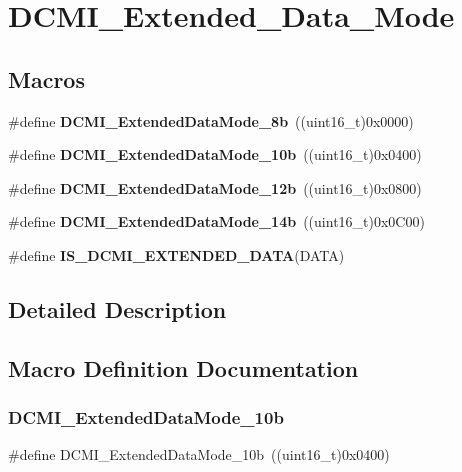 \section{D\+C\+M\+I\+\_\+\+Extended\+\_\+\+Data\+\_\+\+Mode}
\label{group__DCMI__Extended__Data__Mode}
\subsection*{Macros}
\begin{DoxyCompactItemize}
\item 
\#define \textbf{ D\+C\+M\+I\+\_\+\+Extended\+Data\+Mode\+\_\+8b}~((uint16\+\_\+t)0x0000)
\item 
\#define \textbf{ D\+C\+M\+I\+\_\+\+Extended\+Data\+Mode\+\_\+10b}~((uint16\+\_\+t)0x0400)
\item 
\#define \textbf{ D\+C\+M\+I\+\_\+\+Extended\+Data\+Mode\+\_\+12b}~((uint16\+\_\+t)0x0800)
\item 
\#define \textbf{ D\+C\+M\+I\+\_\+\+Extended\+Data\+Mode\+\_\+14b}~((uint16\+\_\+t)0x0\+C00)
\item 
\#define \textbf{ I\+S\+\_\+\+D\+C\+M\+I\+\_\+\+E\+X\+T\+E\+N\+D\+E\+D\+\_\+\+D\+A\+TA}(D\+A\+TA)
\end{DoxyCompactItemize}


\subsection{Detailed Description}


\subsection{Macro Definition Documentation}
\mbox{\label{group__DCMI__Extended__Data__Mode_gad47d200f9e2bf947dd07b9f8bc395336}} 
\subsubsection{D\+C\+M\+I\+\_\+\+Extended\+Data\+Mode\+\_\+10b}
{\footnotesize\ttfamily \#define D\+C\+M\+I\+\_\+\+Extended\+Data\+Mode\+\_\+10b~((uint16\+\_\+t)0x0400)}

